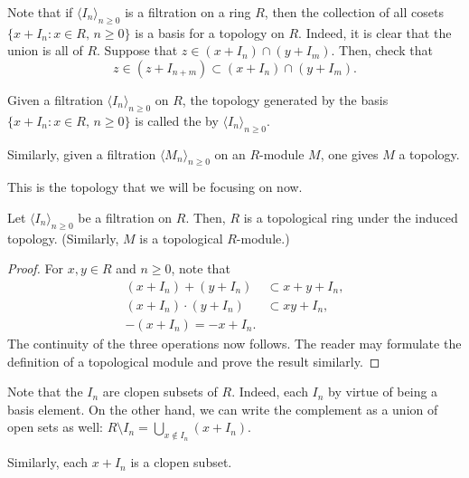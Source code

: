 \documentclass[12pt]{article}
\begin{document}
Note that if $\langle I_{n} \rangle_{n \ge 0}$ is a filtration on a ring $R$, then the collection of all cosets $\{x + I_{n} : x \in R,\, n \ge 0\}$ is a basis for a topology on $R$. Indeed, it is clear that the union is all of $R$. Suppose that $z \in (x + I_{n}) \cap (y + I_{m})$. Then, check that
\begin{equation*} 
	z \in (z + I_{n + m}) \subset (x + I_{n}) \cap (y + I_{m}).
\end{equation*}

\begin{defn}
	Given a filtration $\langle I_{n} \rangle_{n \ge 0}$ on $R$, the topology generated by the basis $\{x + I_{n} : x \in R,\, n \ge 0\}$ is called the  by $\langle I_{n} \rangle_{n \ge 0}$.

	Similarly, given a filtration $\langle M_{n} \rangle_{n \ge 0}$ on an $R$-module $M$, one gives $M$ a topology.
\end{defn}

This is the topology that we will be focusing on now.

\begin{prop}
	Let $\langle I_{n} \rangle_{n \ge 0}$ be a filtration on $R$. Then, $R$ is a topological ring under the induced topology. (Similarly, $M$ is a topological $R$-module.)
\end{prop}
\begin{proof} 
	For $x, y \in R$ and $n \ge 0$, note that
	\begin{align*} 
		(x + I_{n}) + (y + I_{n}) &\subset x + y + I_{n}, \\
		(x + I_{n}) \cdot (y + I_{n}) &\subset xy + I_{n}, \\
		-(x + I_{n}) = -x + I_{n}.
	\end{align*}
	The continuity of the three operations now follows. The reader may formulate the definition of a topological module and prove the result similarly.
\end{proof}

\begin{obs}
	Note that the $I_{n}$ are clopen subsets of $R$. Indeed, each $I_{n}$ by virtue of being a basis element. On the other hand, we can write the complement as a union of open sets as well: $R \setminus I_{n} = \bigcup_{x \notin I_{n}} (x + I_{n})$. 

	Similarly, each $x + I_{n}$ is a clopen subset.
\end{obs}
\end{document}
